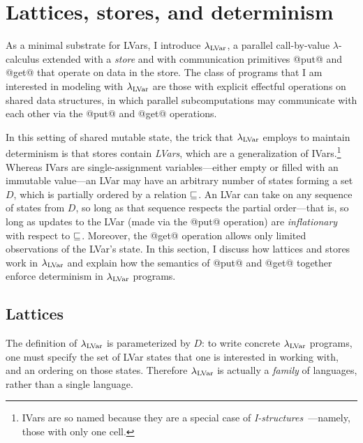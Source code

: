 \section{Lattices, stores, and determinism}\label{s:lvars-lattices}

As a minimal substrate for LVars, I introduce $\lambda_{\textrm{LVar}}$, a
parallel call-by-value $\lambda$-calculus extended with a \emph{store}
and with communication primitives @put@ and @get@ that operate on data
in the store.  The class of programs that I am interested in modeling
with $\lambda_{\textrm{LVar}}$ are those with explicit effectful operations on
shared data structures, in which parallel subcomputations may
communicate with each other via the @put@ and @get@ operations.

In this setting of shared mutable state, the trick that $\lambda_{\textrm{LVar}}$
employs to maintain determinism is that stores contain \emph{LVars},
which are a generalization of IVars.\footnote{IVars are so named
  because they are a special case of
  \emph{I-structures}~\cite{IStructures}---namely, those with only one
  cell.}  Whereas IVars are single-assignment variables---either empty
or filled with an immutable value---an LVar may have an arbitrary
number of states forming a set $D$, which is partially ordered by a
relation $\sqsubseteq$.  An LVar can take on any sequence of states from
$D$, so long as that sequence respects the partial order---that is, so
long as updates to the LVar (made via the @put@ operation) are
\emph{inflationary} with respect to $\sqsubseteq$.  Moreover, the @get@
operation allows only limited observations of the LVar's state.  In
this section, I discuss how lattices and stores work in $\lambda_{\textrm{LVar}}$
and explain how the semantics of @put@ and @get@ together enforce
determinism in $\lambda_{\textrm{LVar}}$ programs.

\subsection{Lattices}\label{subsection:lvars-lattices}

The definition of $\lambda_{\textrm{LVar}}$ is parameterized by $D$: to write
concrete $\lambda_{\textrm{LVar}}$ programs, one must specify the set of LVar
states that one is interested in working with, and an ordering on
those states.  Therefore $\lambda_{\textrm{LVar}}$ is actually a \emph{family} of
languages, rather than a single language.

